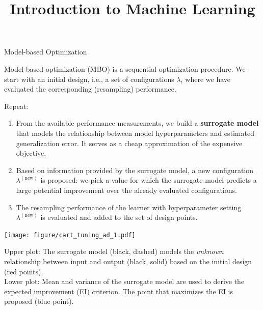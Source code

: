 \documentclass[11pt,compress,t,notes=noshow, xcolor=table]{beamer}
\title{Introduction to Machine Learning}
\institute{\href{https://compstat-lmu.github.io/lecture_i2ml/}{compstat-lmu.github.io/lecture\_i2ml}}
\date{}
\newenvironment{knitrout}{}{} %
\begin{document}








  

\sloppy

\begin{vbframe}{Model-based Optimization}

Model-based optimization (MBO) is a sequential optimization procedure. We start with an initial design, i.e., a set of configurations $\lambda_i$ where we have evaluated the corresponding (resampling) performance. 

Repeat:
  \begin{enumerate}
\item From the available performance measurements, we build a \textbf{surrogate model} that models the relationship between model hyperparameters and estimated generalization error. It serves as a cheap approximation of the expensive objective. 
\item Based on information provided by the surrogate model, a new configuration $\lambda^{(\text{new})}$ is proposed: we pick a value for which the surrogate model predicts a large potential improvement over the already evaluated configurations.
\item The resampling performance of the learner with hyperparameter setting $\lambda^{(\text{new})}$ is evaluated and added to the set of design points.  
\end{enumerate}

\framebreak 

\begin{knitrout}\scriptsize
{}\color{fgcolor}

{\centering \texttt{[image: figure/cart\_tuning\_ad\_1.pdf]} 

}



\end{knitrout}
  
  \begin{footnotesize}
Upper plot: The surrogate model (black, dashed) models the \emph{unknown} relationship between input and output (black, solid) based on the initial design (red points).\\
Lower plot: Mean and variance of the surrogate model are used to derive the expected improvement (EI) criterion. The point that maximizes the EI is proposed (blue point). 
\end{footnotesize}


\end{vbframe}
\end{document}
